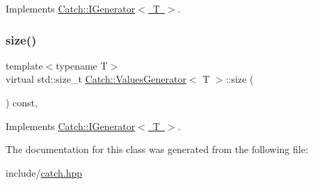 Implements \mbox{\hyperlink{struct_catch_1_1_i_generator_ad69e937cb66dba3ed9429c42abf4fce3}{Catch\+::\+I\+Generator$<$ T $>$}}.

\mbox{\label{class_catch_1_1_values_generator_a9aa5b140ee502975cf35115e534ab771}} 
\subsubsection{\texorpdfstring{size()}{size()}}
{\footnotesize\ttfamily template$<$typename T$>$ \\
virtual std\+::size\+\_\+t \mbox{\hyperlink{class_catch_1_1_values_generator}{Catch\+::\+Values\+Generator}}$<$ T $>$\+::size (\begin{DoxyParamCaption}{ }\end{DoxyParamCaption}) const\hspace{0.3cm}{\ttfamily [inline]}, {\ttfamily [virtual]}}



Implements \mbox{\hyperlink{struct_catch_1_1_i_generator_a2e317253b03e838b6065ce69719a198e}{Catch\+::\+I\+Generator$<$ T $>$}}.



The documentation for this class was generated from the following file\+:\begin{DoxyCompactItemize}
\item 
include/\mbox{\hyperlink{catch_8hpp}{catch.\+hpp}}\end{DoxyCompactItemize}

